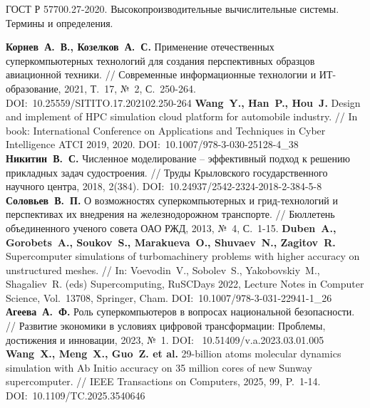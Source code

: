 \newpage
\renewcommand{\baselinestretch}{1.0}
\begin{thebibliography}{99}


ГОСТ Р 57700.27-2020. Высокопроизводительные вычислительные системы. Термины и определения.

\textbf{Корнев~А.~В., Козелков~А.~С.} Применение отечественных суперкомпьютерных технологий для создания перспективных образцов авиационной техники. // Современные информационные технологии и ИТ-образование, 2021, Т.~17, №~2, С.~250-264. DOI:~10.25559/SITITO.17.202102.250-264
\textbf{Wang~Y., Han~P., Hou~J.} Design and implement of HPC simulation cloud platform for automobile industry. // In book: International Conference on Applications and Techniques in Cyber Intelligence ATCI 2019, 2020. DOI:~10.1007/978-3-030-25128-4\_38
\textbf{Никитин~В.~С.} Численное моделирование -- эффективный подход к решению прикладных задач судостроения. // Труды Крыловского государственного научного центра, 2018, 2(384). DOI:~10.24937/2542-2324-2018-2-384-5-8
\textbf{Соловьев~В.~П.} О возможностях суперкомпьютерных и грид-технологий и перспективах их внедрения на железнодорожном транспорте. // Бюллетень объединенного ученого совета ОАО РЖД, 2013, №~4, С.~1-15.
\textbf{Duben~A., Gorobets~A., Soukov~S., Marakueva~O., Shuvaev~N., Zagitov~R.} Supercomputer simulations of turbomachinery problems with higher accuracy on unstructured meshes. // In: Voevodin~V., Sobolev~S., Yakobovskiy~M., Shagaliev~R. (eds) Supercomputing, RuSCDays 2022, Lecture Notes in Computer Science, Vol.~13708, Springer, Cham. DOI:~10.1007/978-3-031-22941-1\_26 
\textbf{Агеева~А.~Ф.} Роль суперкомпьютеров в вопросах национальной безопасности. // Развитие экономики в условиях цифровой трансформации: Проблемы, достижения и инновации, 2023, №~1. DOI:~ 10.51409/v.a.2023.03.01.005
\textbf{Wang~X., Meng~X., Guo~Z. et al.} 29-billion atoms molecular dynamics simulation with Ab Initio accuracy on 35 million cores of new Sunway supercomputer. // IEEE Transactions on Computers, 2025, 99, P.~1-14. DOI:~10.1109/TC.2025.3540646


\end{thebibliography}

